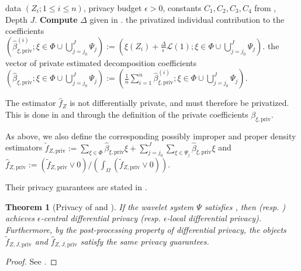 \documentclass{article}
\newcommand{\1}{\mathds{1}}
\theoremstyle{plain}
\newtheorem{theorem}{Theorem}[section]
\theoremstyle{definition}
\theoremstyle{remark}
\begin{document}
\begin{algorithm}[tb]
  \caption{Querying mechanism, local DP}
  \label{alg:density_estimation_localDP}
  \begin{algorithmic}
     data $(Z_i; 1 \leq i \leq n)$, privacy budget $\epsilon > 0$, constants $C_1, C_2, C_3, C_4$ from , Depth $J$.
    \STATE \textbf{Compute} $\Delta$ given in .
     the privatized individual contribution to the coefficients $(\hat \beta_{\xi, \textrm{priv}}^{(i)}; \xi \in \Phi \cup \bigcup_{j = j_0 }^{J} \Psi_j) := ( \xi(Z_i) + \frac{\Delta}{\epsilon} \mathcal{L}(1); \xi \in \Phi \cup \bigcup_{j = j_0 }^{J} \Psi_j)$.
    \ENDFOR
     the vector of private estimated decomposition coefficients $(\hat \beta_{\xi, \textrm{priv}}; \xi \in \Phi \cup \bigcup_{j = j_0 }^{J} \Psi_j) := (\frac{1}{n} \sum_{i=1}^n \hat \beta_{\xi, \textrm{priv}}^{(i)}; \xi \in \Phi \cup \bigcup_{j = j_0 }^{J} \Psi_j)$.
  \end{algorithmic}
\end{algorithm}

\FloatBarrier

The estimator $\hat{f}_Z$ is not differentially private, and must therefore be privatized. This is done in  and  through the definition of the private coefficients $\beta_{\xi, \textrm{priv}}$.

As above, we also define the corresponding possibly improper and proper density estimators
$\tilde{f}_{Z, \textrm{priv}} := \sum_{\xi \in \Phi} \hat{\beta}_{\xi, \textrm{priv}} \xi + \sum_{j = j_0 }^{J} \sum_{\xi \in \Psi_j} \hat{\beta}_{\xi, \textrm{priv}} \xi$
and
$\hat{f}_{Z, \textrm{priv}} :=(\tilde{f}_{Z, \textrm{priv}} \vee 0) / (\int_{\Omega} (\tilde{f}_{Z, \textrm{priv}} \vee 0))$.

Their privacy guarantees are stated in .

\begin{theorem}[Privacy of  and ]
\label{th:privacy_guarantees_density}
    If the wavelet system $\Psi$ satisfies , then  (resp. ) achieves $\epsilon$-central differential privacy (resp. $\epsilon$-local differential privacy). Furthermore, by the post-processing property of differential privacy, the objects $\tilde{f}_{Z, J, \textrm{priv}}$ and $\hat{f}_{Z, J, \textrm{priv}}$ satisfy the same privacy guarantees.
\end{theorem}
\begin{proof}
    See .
\end{proof}
\end{document}
